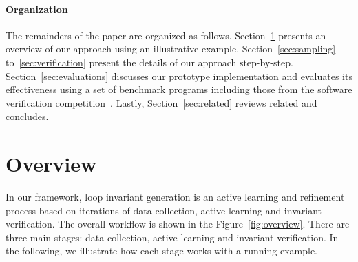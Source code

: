 \paragraph{Organization} The remainders of the paper are organized as follows. Section~\ref{sec:overview} presents an overview of our approach using an illustrative example. Section~\ref{sec:sampling} to~\ref{sec:verification} present the details of our approach step-by-step. Section~\ref{sec:evaluations} discusses our prototype implementation and evaluates its effectiveness using a set of benchmark programs including those from the software verification competition~\cite{}. Lastly, Section~\ref{sec:related} reviews related and concludes.

\section{Overview} \label{sec:overview}
In our framework, loop invariant generation is an active learning and refinement process based on iterations of data collection, active learning and invariant verification. The overall workflow is shown in the Figure~\ref{fig:overview}. There are three main stages: data collection, active learning and invariant verification. In the following, we illustrate how each stage works with a running example.

